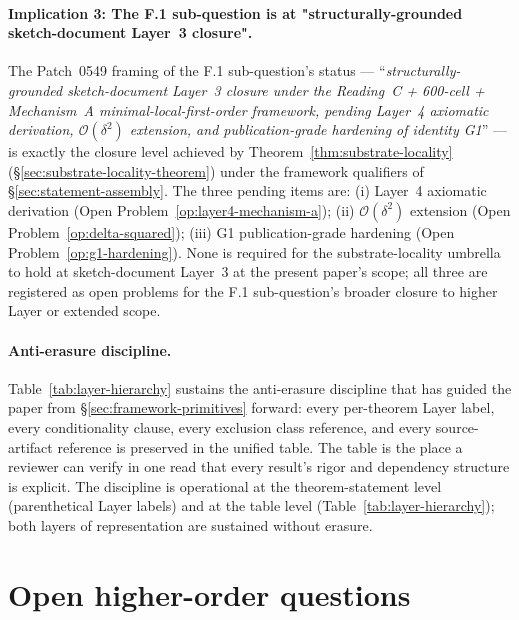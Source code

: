 \documentclass[11pt,letterpaper]{article}
\newcommand{\bigO}[1]{\mathcal{O}(#1)}
\begin{document}
\paragraph{Implication 3: The F.1 sub-question is at "structurally-grounded sketch-document Layer~3 closure".}
The Patch~0549 framing of the F.1 sub-question's status --- ``\emph{structurally-grounded sketch-document Layer~3 closure under the Reading~C + 600-cell + Mechanism~A minimal-local-first-order framework, pending Layer~4 axiomatic derivation, $\bigO{\delta^2}$ extension, and publication-grade hardening of identity G1}'' --- is exactly the closure level achieved by Theorem~\ref{thm:substrate-locality} (\S\ref{sec:substrate-locality-theorem}) under the framework qualifiers of \S\ref{sec:statement-assembly}. The three pending items are: (i) Layer~4 axiomatic derivation (Open Problem~\ref{op:layer4-mechanism-a}); (ii) $\bigO{\delta^2}$ extension (Open Problem~\ref{op:delta-squared}); (iii) G1 publication-grade hardening (Open Problem~\ref{op:g1-hardening}). None is required for the substrate-locality umbrella to hold at sketch-document Layer~3 at the present paper's scope; all three are registered as open problems for the F.1 sub-question's broader closure to higher Layer or extended scope.

\paragraph{Anti-erasure discipline.}
Table~\ref{tab:layer-hierarchy} sustains the anti-erasure discipline that has guided the paper from \S\ref{sec:framework-primitives} forward: every per-theorem Layer label, every conditionality clause, every exclusion class reference, and every source-artifact reference is preserved in the unified table. The table is the place a reviewer can verify in one read that every result's rigor and dependency structure is explicit. The discipline is operational at the theorem-statement level (parenthetical Layer labels) and at the table level (Table~\ref{tab:layer-hierarchy}); both layers of representation are sustained without erasure.

\section{Open higher-order questions}
\label{sec:open-questions}
\end{document}
